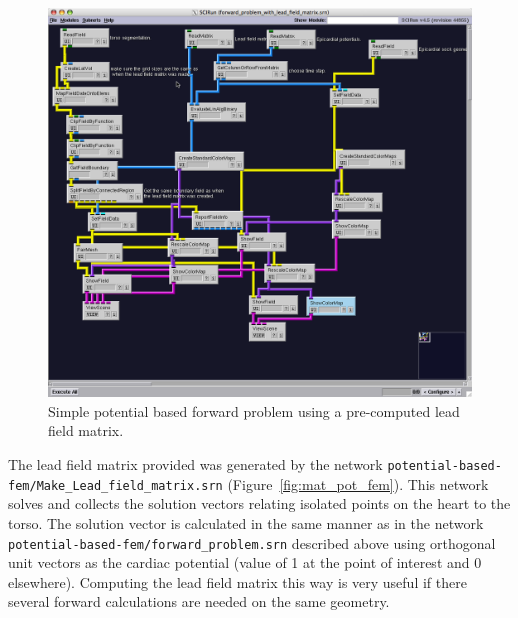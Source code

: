 \begin{figure}[H]
\begin{center}
\includegraphics[width=\textwidth]{ECGToolkitGuide_figures/potential_forward_fem_with_leadfield.png}
\caption{Simple potential based forward problem using a pre-computed lead field matrix.}
\label{fig:pot_for_fem_w_mat}
\end{center}
\end{figure} 

The lead field matrix provided was generated by the network {\tt potential-based-fem/Make\_Lead\_field\_matrix.srn} (Figure~\ref{fig:mat_pot_fem}).  This network solves and collects the solution vectors relating isolated points on the heart to the torso.  The solution vector is calculated in the same manner as in the network {\tt potential-based-fem/forward\_problem.srn} described above using orthogonal unit vectors as the cardiac  potential (value of 1 at the point of interest and 0 elsewhere).  Computing the lead field matrix this way is very useful if there several forward calculations are needed on the same geometry.  

